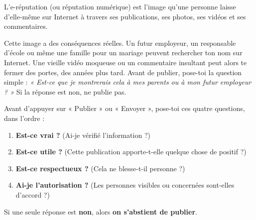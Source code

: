 \documentclass[11pt]{article}
\newcommand{\cle}[1]{{\popxbold\color{popdark}#1}}
\begin{document}
\begin{definition}[L'e-réputation]
L'\cle{e-réputation} (ou réputation numérique) est l'image qu'une personne laisse d'elle-même sur Internet à travers ses publications, ses photos, ses vidéos et ses commentaires.
\end{definition}

Cette image a des conséquences réelles. Un futur employeur, un responsable d'école ou même une famille pour un mariage peuvent rechercher ton nom sur Internet. Une vieille vidéo moqueuse ou un commentaire insultant peut alors te fermer des portes, des années plus tard. Avant de publier, pose-toi la question simple : \emph{« Est-ce que je montrerais cela à mes parents ou à mon futur employeur ? »} Si la réponse est non, ne publie pas.

\begin{methode}
Avant d'appuyer sur « Publier » ou « Envoyer », pose-toi ces quatre questions, dans l'ordre :
\begin{enumerate}
\item \textbf{Est-ce vrai ?} (Ai-je vérifié l'information ?)
\item \textbf{Est-ce utile ?} (Cette publication apporte-t-elle quelque chose de positif ?)
\item \textbf{Est-ce respectueux ?} (Cela ne blesse-t-il personne ?)
\item \textbf{Ai-je l'autorisation ?} (Les personnes visibles ou concernées sont-elles d'accord ?)
\end{enumerate}
Si une seule réponse est \textbf{non}, alors \textbf{on s'abstient de publier}.
\end{methode}
\end{document}
